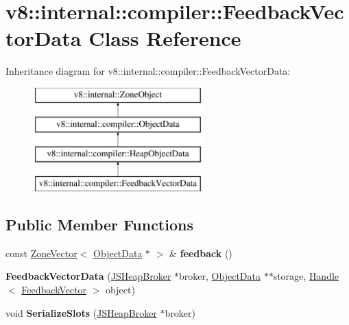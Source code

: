 \hypertarget{classv8_1_1internal_1_1compiler_1_1FeedbackVectorData}{}\section{v8\+:\+:internal\+:\+:compiler\+:\+:Feedback\+Vector\+Data Class Reference}
\label{classv8_1_1internal_1_1compiler_1_1FeedbackVectorData}
Inheritance diagram for v8\+:\+:internal\+:\+:compiler\+:\+:Feedback\+Vector\+Data\+:\begin{figure}[H]
\begin{center}
\leavevmode
\includegraphics[height=4.000000cm]{classv8_1_1internal_1_1compiler_1_1FeedbackVectorData}
\end{center}
\end{figure}
\subsection*{Public Member Functions}
\begin{DoxyCompactItemize}
\item 
\mbox{\label{classv8_1_1internal_1_1compiler_1_1FeedbackVectorData_a4ba6d431e26fd05b719234c649a21ae2}} 
const \mbox{\hyperlink{classv8_1_1internal_1_1ZoneVector}{Zone\+Vector}}$<$ \mbox{\hyperlink{classv8_1_1internal_1_1compiler_1_1ObjectData}{Object\+Data}} $\ast$ $>$ \& {\bfseries feedback} ()
\item 
\mbox{\label{classv8_1_1internal_1_1compiler_1_1FeedbackVectorData_a20b8682d738fa27908512248a76eb649}} 
{\bfseries Feedback\+Vector\+Data} (\mbox{\hyperlink{classv8_1_1internal_1_1compiler_1_1JSHeapBroker}{J\+S\+Heap\+Broker}} $\ast$broker, \mbox{\hyperlink{classv8_1_1internal_1_1compiler_1_1ObjectData}{Object\+Data}} $\ast$$\ast$storage, \mbox{\hyperlink{classv8_1_1internal_1_1Handle}{Handle}}$<$ \mbox{\hyperlink{classv8_1_1internal_1_1FeedbackVector}{Feedback\+Vector}} $>$ object)
\item 
\mbox{\label{classv8_1_1internal_1_1compiler_1_1FeedbackVectorData_aabe7d266fa93843ac17a2ed3a5d74fc4}} 
void {\bfseries Serialize\+Slots} (\mbox{\hyperlink{classv8_1_1internal_1_1compiler_1_1JSHeapBroker}{J\+S\+Heap\+Broker}} $\ast$broker)
\end{DoxyCompactItemize}
